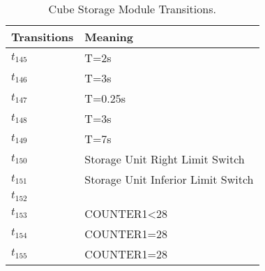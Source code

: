 \begin{table}[H]
\caption{Cube Storage Module Transitions.}
\centering
\begin{tabular}{M{5cm}M{10cm}}
Transitions & Meaning\\
\hline
\hyperlink{partialNet:tt145}{\hypertarget{partialTable:tt145}{$t_{145}$}} & T=2s\\
\hyperlink{partialNet:tt146}{\hypertarget{partialTable:tt146}{$t_{146}$}} & T=3s\\
\hyperlink{partialNet:tt147}{\hypertarget{partialTable:tt147}{$t_{147}$}} & T=0.25s\\
\hyperlink{partialNet:tt148}{\hypertarget{partialTable:tt148}{$t_{148}$}} & T=3s\\
\hyperlink{partialNet:tt149}{\hypertarget{partialTable:tt149}{$t_{149}$}} & T=7s\\
\hyperlink{partialNet:t150}{\hypertarget{partialTable:t150}{$t_{150}$}} & Storage Unit Right Limit Switch\\
\hyperlink{partialNet:t151}{\hypertarget{partialTable:t151}{$t_{151}$}} & Storage Unit Inferior Limit Switch\\
\hyperlink{partialNet:t152}{\hypertarget{partialTable:t152}{$t_{152}$}} & \\
\hyperlink{partialNet:t153}{\hypertarget{partialTable:t153}{$t_{153}$}} & COUNTER1<28\\
\hyperlink{partialNet:t154}{\hypertarget{partialTable:t154}{$t_{154}$}} & COUNTER1=28\\
\hyperlink{partialNet:t155}{\hypertarget{partialTable:t155}{$t_{155}$}} & COUNTER1=28\\
\end{tabular}
\end{table}
